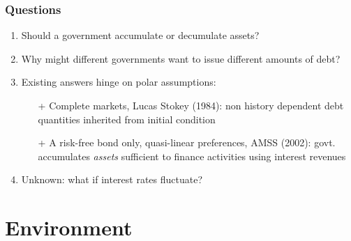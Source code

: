 \documentclass{beamer}
\begin{document}
\begin{frame}
\frametitle{Questions}

\begin{enumerate}
\item Should a  government accumulate or decumulate assets?
\item Why might different governments want to issue different amounts of debt?
\item Existing answers hinge on polar assumptions:
\begin{itemize}
 \item [+] Complete markets, Lucas Stokey (1984): non history dependent debt quantities inherited from initial condition
 \item [+ ] A risk-free bond only, quasi-linear preferences, AMSS (2002): govt. accumulates {\em assets} sufficient to finance activities using interest revenues
\end{itemize}
\item Unknown: what if interest rates fluctuate?
\end{enumerate}
\end{frame}

%
%
%
%
%


\section{Environment}
\end{document}
